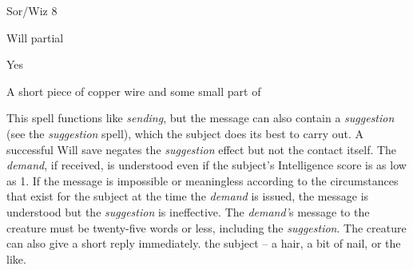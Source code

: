 
\begin{description*}
\item[Level:] Sor/Wiz 8
\item[Saving Throw:] Will partial
\item[Spell Resistance:] Yes
\item[Arcane Material Component:] A short piece of copper wire and some small part of
\end{description*}

This spell functions like \textit{sending}, but the message can also contain a
\textit{suggestion} (see the \textit{suggestion} spell), which the subject does
its best to carry out. A successful Will save negates the \textit{suggestion} effect
but not the contact itself. The \textit{demand}, if received, is understood even
if the subject's Intelligence score is as low as 1. If the message is impossible
or meaningless according to the circumstances that exist for the subject at the
time the \textit{demand} is issued, the message is understood but the \textit{suggestion
}is ineffective.
The \textit{demand'}s message to the creature must be twenty-five words or less,
including the \textit{suggestion}. The creature can also give a short reply immediately.
the subject -- a hair, a bit of nail, or the like.